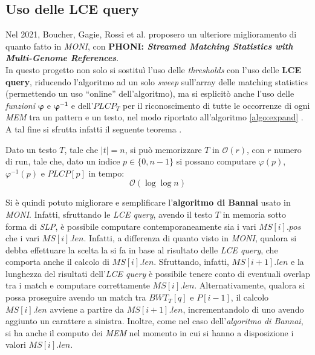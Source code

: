 \subsection{Uso delle LCE query}
Nel 2021, Boucher, Gagie, Rossi et al. proposero un ulteriore miglioramento di
quanto fatto in \textit{MONI}, con \textbf{PHONI: \textit{Streamed Matching
    Statistics with Multi-Genome References}}.\\
In questo progetto non solo si sostituì l'uso delle \textit{thresholds} con
l'uso delle \textbf{LCE query}, riducendo l'algoritmo ad un solo \textit{sweep}
sull'array delle matching statistics (permettendo un uso ``online''
dell'algoritmo), ma si 
esplicitò anche l'uso delle \textit{funzioni} $\mathbf{\varphi}$ e
$\mathbf{\varphi^{-1}}$ e dell'$PLCP_T$ per il riconoscimento di tutte le
occorrenze di ogni \textit{MEM} tra un pattern e un testo, nel modo 
riportato all'algoritmo \ref{algo:expand} \cite{phoni}.\\
A tal fine si sfrutta infatti il seguente teorema \cite{gagie2020}.
\begin{teorema}
  Dato un testo $T$, tale che $|t|=n$, si può memorizzare $T$ in
  $\mathcal{O}(r)$, con $r$ numero di run, tale che, dato un indice
  $p\in\{0,n-1\}$ si possano computare $\varphi(p)$, $\varphi^{-1}(p)$ e
  $PLCP[p]$ in tempo:
  \begin{equation}
    \label{eq:rlpbwt9}
    \mathcal{O}(\log\log n)
  \end{equation}
\end{teorema}
Si è quindi potuto migliorare e semplificare l'\textbf{algoritmo di Bannai}
usato in \textit{MONI}. Infatti, sfruttando le
\textit{LCE query}, avendo il testo $T$ in memoria sotto forma di \textit{SLP},
è possibile computare contemporaneamente sia i vari
$MS[i].pos$ che i vari $MS[i].len$. Infatti, a differenza di quanto visto in
\textit{MONI}, qualora si debba effettuare la scelta la si fa in base al
risultato delle \textit{LCE query}, che comporta anche il calcolo di
$MS[i].len$. Sfruttando, infatti, $MS[i+1].len$ e la lunghezza del risultati
dell'\textit{LCE query} è possibile tenere conto di eventuali overlap tra i
match e computare correttamente $MS[i].len$. Alternativamente, qualora si possa
proseguire avendo un match tra  
$BWT_T[q]$ e $P[i-1]$, il calcolo $MS[i].len$ avviene a partire da
$MS[i+1].len$, incrementandolo di uno avendo aggiunto un carattere a sinistra.
Inoltre, come nel caso dell'\textit{algoritmo
  di Bannai}, si ha anche il computo dei \textit{MEM} nel momento in cui si
hanno a 
disposizione i valori $MS[i].len$.
